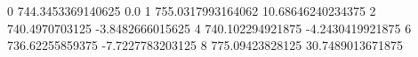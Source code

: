 0 744.3453369140625 0.0
1 755.0317993164062 10.68646240234375
2 740.4970703125 -3.8482666015625
4 740.102294921875 -4.2430419921875
6 736.62255859375 -7.7227783203125
8 775.09423828125 30.7489013671875
